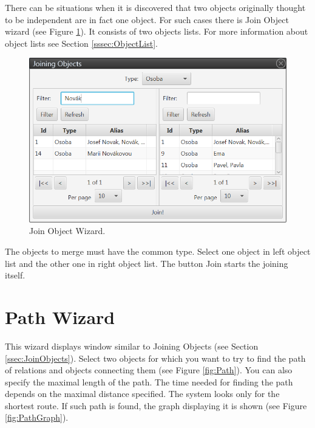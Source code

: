 There can be situations when it is discovered that two objects originally
thought to be independent are in fact one object. For such cases there is Join
Object wizard (see Figure \ref{fig:Join}). It consists of two objects lists. For
more information about object lists see Section \ref{sssec:ObjectList}.

\begin{figure}[!htb]
        \centering
        \includegraphics[width=\textwidth]{Images/join}
        \caption{Join Object Wizard.}
        \label{fig:Join}
\end{figure}

The objects to merge must have the common type. Select one object in left object
list and the other one in right object list. The button Join starts the joining
itself.

\section{Path Wizard}
\label{ssec:PathWizard}

This wizard displays window similar to Joining Objects (see Section
\ref{ssec:JoinObjects}). Select two objects for which you want to try to find
the path of relations and objects connecting them (see Figure \ref{fig:Path}).
You can also specify the maximal length of the path. The time needed for finding
the path depends on the maximal distance specified. The system looks only for
the shortest route. If such path is found, the graph displaying it is shown (see
Figure \ref{fig:PathGraph}).


